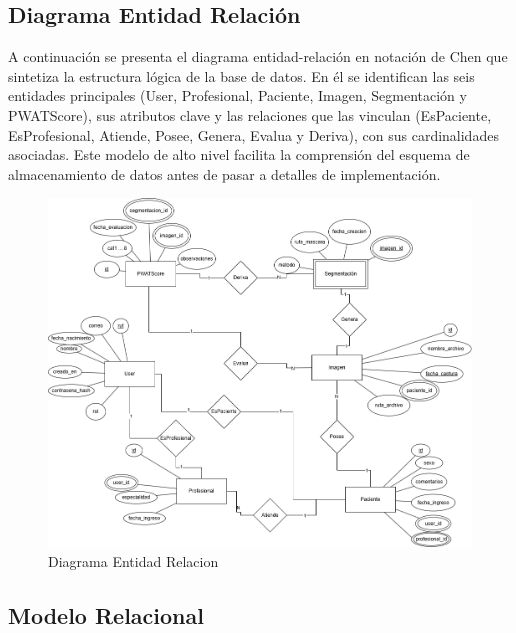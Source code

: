 \subsection{Diagrama Entidad Relación}
\label{ssc:ER}
A continuación se presenta el diagrama entidad-relación en notación de Chen \cite{chen1976entity} que sintetiza la estructura lógica de la base de datos. En él se identifican las seis entidades principales (User, Profesional, Paciente, Imagen, Segmentación y PWATScore), sus atributos clave y las relaciones que las vinculan (EsPaciente, EsProfesional, Atiende, Posee, Genera, Evalua y Deriva), con sus cardinalidades asociadas. Este modelo de alto nivel facilita la comprensión del esquema de almacenamiento de datos antes de pasar a detalles de implementación.
\begin{figure}[H]
    \centering
    \includegraphics[width=1\linewidth]{imagenes/ER (1).png}
    \caption{Diagrama Entidad Relacion}
    \label{fig:classesDiagram}
\end{figure}

\subsection{Modelo Relacional}
\label{ssc:Rel}

